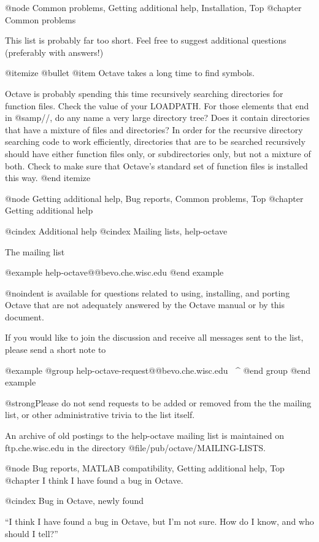 @node Common problems, Getting additional help, Installation, Top
@chapter Common problems

This list is probably far too short.  Feel free to suggest additional
questions (preferably with answers!)

@itemize @bullet
@item
Octave takes a long time to find symbols.

Octave is probably spending this time recursively searching directories
for function files.  Check the value of your LOADPATH.  For those
elements that end in @samp{//}, do any name a very large directory tree?
Does it contain directories that have a mixture of files and
directories?  In order for the recursive directory searching code to
work efficiently, directories that are to be searched recursively should
have either function files only, or subdirectories only, but not a
mixture of both.  Check to make sure that Octave's standard set of
function files is installed this way.
@end itemize

@node Getting additional help, Bug reports, Common problems, Top
@chapter Getting additional help

@cindex Additional help
@cindex Mailing lists, help-octave

The mailing list

@example
help-octave@@bevo.che.wisc.edu
@end example

@noindent
is available for questions related to using, installing, and porting
Octave that are not adequately answered by the Octave manual or by this
document.

If you would like to join the discussion and receive all messages sent
to the list, please send a short note to

@example
@group
help-octave-request@@bevo.che.wisc.edu
            ^^^^^^^
@end group
@end example

@strong{Please do not} send requests to be added or removed from the the
mailing list, or other administrative trivia to the list itself.

An archive of old postings to the help-octave mailing list is maintained
on ftp.che.wisc.edu in the directory @file{/pub/octave/MAILING-LISTS}.

@node Bug reports, MATLAB compatibility, Getting additional help, Top
@chapter I think I have found a bug in Octave.

@cindex Bug in Octave, newly found

``I think I have found a bug in Octave, but I'm not sure.  How do I know,
and who should I tell?''

